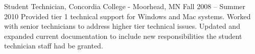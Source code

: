 Student Technician, Concordia College - Moorhead, MN
Fall 2008 – Summer 2010
Provided tier 1 technical support for Windows and Mac systems.
Worked with senior technicians to address higher tier technical issues.
Updated and expanded current documentation to include new responsibilities the student technician staff had be granted.